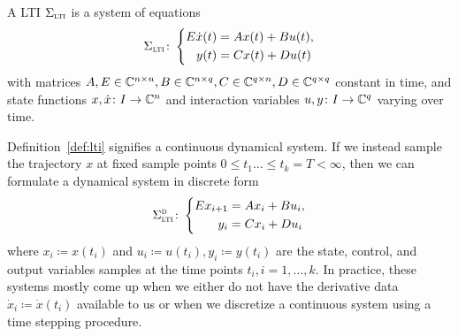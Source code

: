 \begin{definition}\label{def:lti}
    A \acf{LTI} $\Sigma_{\textnormal{\scshape lti}}$ is a system of equations
    \begin{equation}\label{eq:lti}
        \Sigma_{\textnormal{\scshape lti}} \colon \left\lbrace
        \begin{aligned}
            E \dot{x}(t) &= A x(t) + B u(t), \\
            y(t) &= C x(t) + D u(t)
        \end{aligned}
        \right.
    \end{equation}
    with matrices $A, E \in \mathbb{C}^{n \times n}, B \in \mathbb{C}^{n \times q}, C \in \mathbb{C}^{q \times n}, D \in \mathbb{C}^{q \times q}$ constant in time, and state functions $x, \dot{x} \colon I \to \mathbb{C}^n$ and interaction variables $u, y \colon I \to \mathbb{C}^q$ varying over time.
\end{definition}


\begin{remark}
    Definition~\ref{def:lti} signifies a continuous dynamical system.
    If we instead sample the trajectory $x$ at fixed sample points $0 \leq t_1 \dots \leq t_k = T < \infty$, then we can formulate a dynamical system in discrete form
    \begin{equation*}
        \Sigma_{\textnormal{\scshape lti}}^{\textnormal{\scshape d}} \colon \left\lbrace
        \begin{aligned}
            E x_{i + 1} &= A x_i + B u_i, \\
            y_i &= C x_i + D u_i
        \end{aligned}
        \right.
    \end{equation*}
    where $x_i \coloneqq x(t_i)$ and $u_i \coloneqq u(t_i), y_i \coloneqq y(t_i)$ are the state, control, and output variables samples at the time points $t_i, i = 1, \dots, k$.
    In practice, these systems mostly come up when we either do not have the derivative data $\dot{x}_i \coloneqq \dot{x}(t_i)$ available to us or when we discretize a continuous system using a time stepping procedure.
\end{remark}

